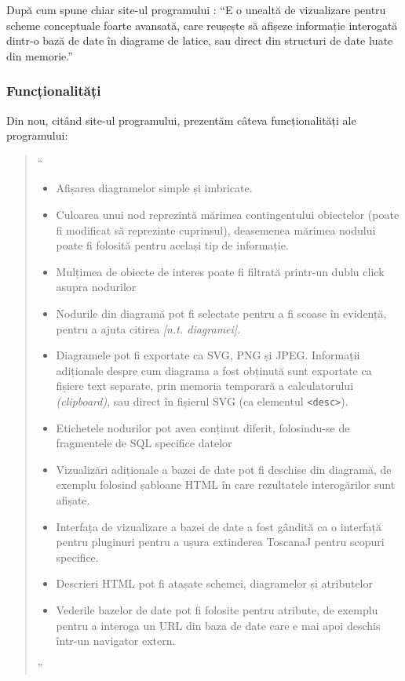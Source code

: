 \documentclass[12pt, a4paper, twoside, romanian]{teza-upb}
\begin{document}
      După cum spune chiar site-ul programului \cite{Toscanaj:toscanaj}: ``E o unealtă de vizualizare pentru scheme conceptuale foarte avansată, care reușește să afișeze informație interogată dintr-o bază de date în diagrame de latice, sau direct din structuri de date luate din memorie.''
      \subsubsection{Funcționalități}
      \label{subsubsec:toscanaj-functionalitati}
      
        Din nou, citând site-ul programului\cite{Toscanaj:toscanaj}, prezentăm câteva funcționalități ale programului:

        \begin{quote}
          ``
          \begin{itemize}
            \item Afișarea diagramelor simple și imbricate.
            \item Culoarea unui nod reprezintă mărimea contingentului obiectelor (poate fi modificat să reprezinte cuprinsul), deasemenea mărimea nodului poate fi folosită pentru același tip de informație.
            \item Mulțimea de obiecte de interes poate fi filtrată printr-un dublu click asupra nodurilor
            \item Nodurile din diagramă pot fi selectate pentru a fi scoase în evidență, pentru a ajuta citirea \textit{[n.t. diagramei]}.
            \item Diagramele pot fi exportate ca SVG, PNG și JPEG. Informații adiționale despre cum diagrama a fost obținută sunt exportate ca fișiere text separate, prin memoria temporară a calculatorului \textit{(clipboard)}, sau direct în fișierul SVG (ca elementul \verb=<desc>=).
            \item Etichetele nodurilor pot avea conținut diferit, folosindu-se de fragmentele de SQL specifice datelor
            \item Vizualizări adiționale a bazei de date pot fi deschise din diagramă, de exemplu folosind șabloane HTML în care rezultatele interogărilor sunt afișate.
            \item Interfața de vizualizare a bazei de date a fost gândită ca o interfață pentru pluginuri pentru a ușura extinderea ToscanaJ pentru scopuri specifice.
            \item Descrieri HTML pot fi atașate schemei, diagramelor și atributelor
            \item Vederile bazelor de date pot fi folosite pentru atribute, de exemplu pentru a interoga un URL din baza de date care e mai apoi deschis într-un navigator extern.
          \end{itemize}
          ''
        \end{quote}
\end{document}
